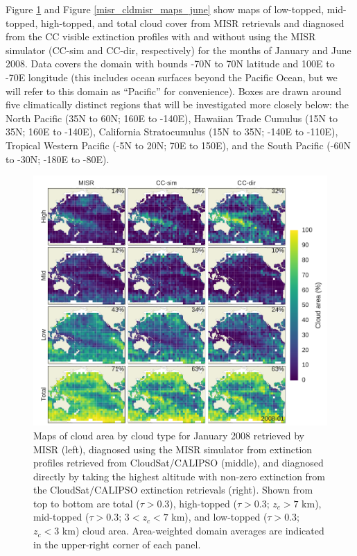Figure \ref{misr_cldmisr_maps_january} and Figure \ref{misr_cldmisr_maps_june} show maps of low-topped, mid-topped, high-topped, and total cloud cover from MISR retrievals and diagnosed from the CC visible extinction profiles with and without using the MISR simulator (CC-sim and CC-dir, respectively) for the months of January and June 2008. Data covers the domain with bounds -70N to 70N latitude and 100E to -70E longitude (this includes ocean surfaces beyond the Pacific Ocean, but we will refer to this domain as ``Pacific'' for convenience). Boxes are drawn around five climatically distinct regions that will be investigated more closely below: the North Pacific (35N to 60N; 160E to -140E), Hawaiian Trade Cumulus (15N to 35N; 160E to -140E), California Stratocumulus (15N to 35N; -140E to -110E), Tropical Western Pacific (-5N to 20N; 70E to 150E), and the South Pacific (-60N to -30N; -180E to -80E).

\begin{figure}
\centering
\includegraphics[width=\columnwidth]{graphics/misr_cldmisr_maps_2008-01.pdf}
\caption{Maps of cloud area by cloud type for January 2008 retrieved by MISR (left), diagnosed using the MISR simulator from extinction profiles retrieved from CloudSat/CALIPSO (middle), and diagnosed directly by taking the highest altitude with non-zero extinction from the CloudSat/CALIPSO extinction retrievals (right). Shown from top to bottom are total ($\tau > 0.3$), high-topped ($\tau > 0.3$; $z_c > 7$ km), mid-topped ($\tau > 0.3$; $3 < z_c < 7$ km), and low-topped ($\tau > 0.3$; $z_c < 3$ km) cloud area. Area-weighted domain averages are indicated in the upper-right corner of each panel.}
\label{misr_cldmisr_maps_january}
\end{figure}

